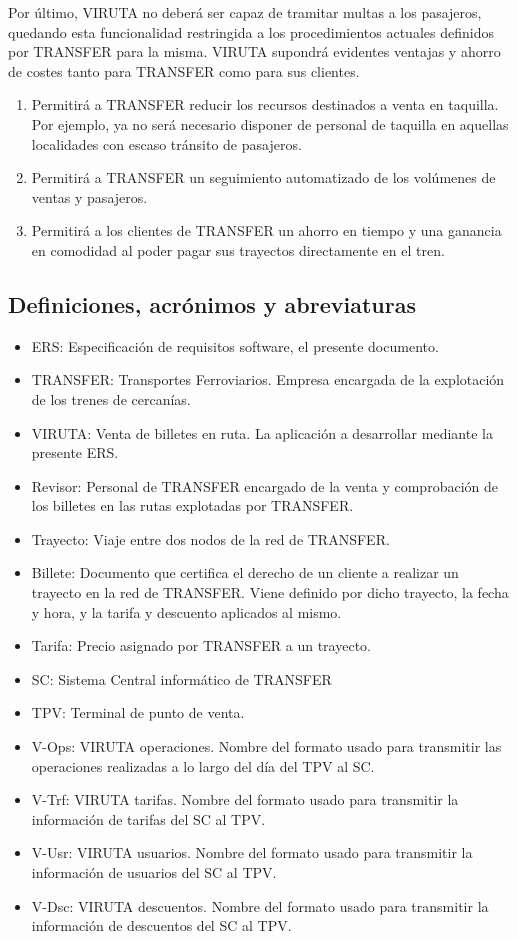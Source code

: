 Por último, VIRUTA no deberá ser capaz de tramitar multas a los pasajeros, quedando esta funcionalidad restringida a los procedimientos actuales definidos por TRANSFER para la misma.
VIRUTA supondrá evidentes ventajas y ahorro de costes tanto para TRANSFER como para sus clientes.\\

\begin{enumerate}
\item Permitirá a TRANSFER reducir los recursos destinados a venta en taquilla. Por ejemplo, ya no será necesario disponer de personal de taquilla en aquellas localidades con escaso tránsito de pasajeros.
\item Permitirá a TRANSFER un seguimiento automatizado de los volúmenes de ventas y pasajeros.
\item Permitirá a los clientes de TRANSFER un ahorro en tiempo y una ganancia en comodidad al poder pagar sus trayectos directamente en el tren.
\end{enumerate}

\subsection{Definiciones, acrónimos y abreviaturas}

\begin{itemize}
\item ERS: Especificación de requisitos software, el presente documento.
\item TRANSFER: Transportes Ferroviarios. Empresa encargada de la explotación de los trenes de cercanías.
\item VIRUTA: Venta de billetes en ruta. La aplicación a desarrollar mediante la presente ERS.
\item Revisor: Personal de TRANSFER encargado de la venta y comprobación de los billetes en las rutas explotadas por TRANSFER.
\item Trayecto: Viaje entre dos nodos de la red de TRANSFER.
\item Billete: Documento que certifica el derecho de un cliente a realizar un trayecto en la red de TRANSFER. Viene definido por dicho trayecto, la fecha y hora, y la tarifa y descuento aplicados al mismo.
\item Tarifa: Precio asignado por TRANSFER a un trayecto.
\item SC: Sistema Central informático de TRANSFER
\item TPV: Terminal de punto de venta.
\item V-Ops: VIRUTA operaciones. Nombre del formato usado para transmitir las operaciones realizadas a lo largo del día del TPV al SC.
\item V-Trf: VIRUTA tarifas. Nombre del formato usado para transmitir la información de tarifas del SC al TPV.
\item V-Usr: VIRUTA usuarios. Nombre del formato usado para transmitir la información de usuarios del SC al TPV.
\item V-Dsc: VIRUTA descuentos. Nombre del formato usado para transmitir la información de descuentos del SC al TPV.

\end{itemize}

